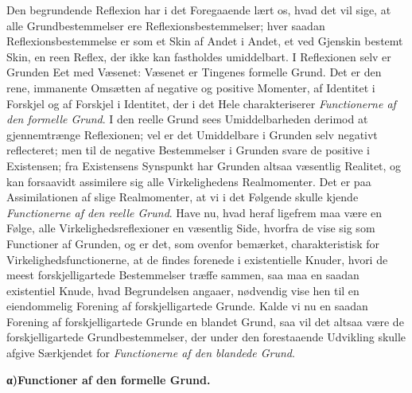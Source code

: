 \documentclass[12pt]{book}
\newcommand{\opage}[1]{\marginnote{\footnotesize\textit{[#1]}}}
\begin{document}
Den begrundende Reflexion har i det Foregaaende lært os, hvad det vil sige, at alle Grundbestemmelser
ere Reflexionsbestemmelser; hver saadan Reflexionsbestemmelse er som et Skin af Andet i Andet, et ved
Gjenskin bestemt Skin, en reen Reflex, der ikke kan fastholdes umiddelbart. I Reflexionen selv er
Grunden Eet med Væsenet: Væsenet er Tingenes formelle Grund. Det er den rene, immanente Omsætten af
negative og positive Momenter, af Identitet i Forskjel og af Forskjel i Identitet, der i det Hele
charakteriserer \emph{Functionerne af den formelle Grund}. I den reelle Grund sees Umiddelbarheden
derimod at gjennemtrænge Reflexionen; vel er det Umiddelbare i Grunden selv negativt reflecteret; men
til de negative Bestemmelser i Grunden svare de positive i Existensen; fra Existensens Synspunkt har
Grunden altsaa væsentlig Realitet, og kan forsaavidt assimilere sig alle Virkelighedens Realmomenter.
Det er paa Assimilationen af slige Realmomenter, at vi i det Følgende skulle kjende \emph{Functionerne
af den reelle Grund}. Have nu, hvad heraf ligefrem maa være en Følge, alle Virkelighedsreflexioner en
væsentlig Side, hvorfra de vise sig som Functioner af Grunden, og er det, som ovenfor bemærket,
charakteristisk for Virkelighedsfunctionerne, at de findes forenede i existentielle Knuder, hvori de
meest forskjelligartede Bestemmelser træffe sammen, saa maa en saadan existentiel Knude, hvad
Begrundelsen angaaer, nødvendig
\opage{287} vise hen til en eiendommelig Forening af forskjelligartede Grunde. Kalde vi nu en saadan Forening af
forskjelligartede Grunde en blandet Grund, saa vil det altsaa være de forskjelligartede
Grundbestemmelser, der under den forestaaende Udvikling skulle afgive Særkjendet for \emph{Functionerne
af den blandede Grund}.

\begin{center}{\bfseries α)\quad Functioner af den formelle Grund.}\end{center}
\end{document}
